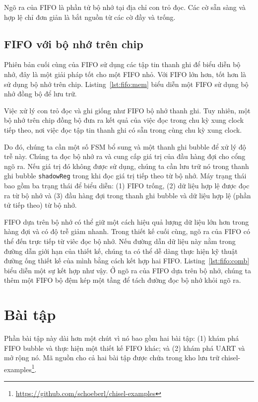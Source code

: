\documentclass[%
    10pt,
    headinclude, footexclude,
    openright, %
    notitlepage,
    cleardoubleempty,
    headsepline,
    pointlessnumbers,
    bibtotoc, idxtotoc,
    ]{scrbook}
\newcommand{\code}[1]{{\small{\texttt{#1}}}}
\newcommand{\myref}[2]{\href{#1}{#2}}
\renewcommand{\myref}[2]{{#2}{\footnote{\url{#1}}}}
\begin{document}
Ngõ ra của FIFO là phần tử bộ nhớ tại địa chỉ con trỏ đọc. Các cờ sẵn sàng và hợp lệ chỉ đơn giản là bắt nguồn từ các cờ đầy và trống. 

\subsection{FIFO với bộ nhớ trên chip}

Phiên bản cuối cùng của FIFO sử dụng các tập tin thanh ghi để biểu diễn bộ nhớ, đây là một giải pháp tốt cho một FIFO nhỏ. Với FIFO lớn hơn, tốt hơn là sử dụng bộ nhớ trên chip. Listing~\ref{lst:fifo:mem} biểu diễn một FIFO sử dụng bộ nhớ đồng bộ để lưu trữ. 


Việc xử lý con trỏ đọc và ghi giống như FIFO bộ nhớ thanh ghi. Tuy nhiên, một bộ nhớ trên chip đồng bộ đưa ra kết quả của việc đọc trong chu kỳ xung clock tiếp theo, nơi việc đọc tập tin thanh ghi có sẵn trong cùng chu kỳ xung clock.

Do đó, chúng ta cần một số FSM bổ sung và một thanh ghi bubble để xử lý độ trễ này. Chúng ta đọc bộ nhớ ra và cung cấp giá trị của đầu hàng đợi cho cổng ngõ ra. Nếu giá trị đó không được sử dụng, chúng ta cần lưu trữ nó trong thanh ghi bubble \code{shadowReg} trong khi đọc giá trị tiếp theo từ bộ nhớ. Máy trạng thái bao gồm ba trạng thái để biểu diễn: (1) FIFO trống, (2) dữ liệu hợp lệ được đọc ra từ bộ nhớ và (3) đầu hàng đợi trong thanh ghi bubble và dữ liệu hợp lệ (phần tử tiếp theo) từ bộ nhớ.

FIFO dựa trên bộ nhớ có thể giữ một cách hiệu quả lượng dữ liệu lớn hơn trong hàng đợi và có độ trễ giảm nhanh. Trong thiết kế cuối cùng, ngõ ra của FIFO có thể đến trực tiếp từ viêc đọc bộ nhớ. Nếu đường dẫn dữ liệu này nằm trong đường dẫn giới hạn của thiết kế, chúng ta có thể dễ dàng thực hiện kỹ thuật đường ống thiết kế của mình bằng cách kết hợp hai FIFO. Listing~\ref{lst:fifo:comb} biểu diễn một sự kết hợp như vậy. Ở ngõ ra của FIFO dựa trên bộ nhớ, chúng ta thêm một FIFO bộ đệm kép một tầng để tách đường đọc bộ nhớ khỏi ngõ ra. 


\section{Bài tập}

Phần bài tập này dài hơn một chút vì nó bao gồm hai bài tập:
(1) khám phá FIFO bubble và thực hiện một thiết kế FIFO khác;
và (2) khám phá UART và mở rộng nó. 
Mã nguồn cho cả hai bài tập được chứa trong kho lưu trữ 
\myref{https://github.com/schoeberl/chisel-examples}{chisel-examples}.
\end{document}
